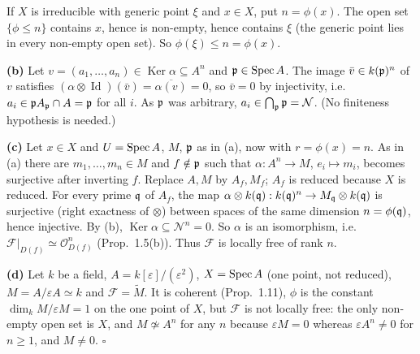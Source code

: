\documentclass[11pt]{article}
\begin{document}
If $X$ is irreducible with generic point $\xi$ and $x\in X$, put $n=\phi(x)$. The open set $\{\phi\le n\}$ contains $x$, hence is non-empty, hence contains $\xi$ (the generic point lies in every non-empty open set). So $\phi(\xi)\le n=\phi(x)$.

\textbf{(b)} Let $v=(a_1,\dots,a_n)\in\operatorname{Ker}\alpha\subseteq A^n$ and $\mathfrak p\in\operatorname{Spec} A$. The image $\bar v\in k(\mathfrak p)^n$ of $v$ satisfies $(\alpha\otimes\operatorname{Id})(\bar v)=\overline{\alpha(v)}=0$, so $\bar v=0$ by injectivity, i.e.\ $a_i\in\mathfrak p A_\mathfrak p\cap A=\mathfrak p$ for all $i$. As $\mathfrak p$ was arbitrary, $a_i\in\bigcap_\mathfrak p\mathfrak p=\mathcal N$. (No finiteness hypothesis is needed.)

\textbf{(c)} Let $x\in X$ and $U=\operatorname{Spec} A$, $M$, $\mathfrak p$ as in (a), now with $r=\phi(x)=n$. As in (a) there are $m_1,\dots,m_n\in M$ and $f\notin\mathfrak p$ such that $\alpha:A^n\to M$, $e_i\mapsto m_i$, becomes surjective after inverting $f$. Replace $A,M$ by $A_f,M_f$; $A_f$ is reduced because $X$ is reduced. For every prime $\mathfrak q$ of $A_f$, the map $\alpha\otimes k(\mathfrak q):k(\mathfrak q)^n\to M_\mathfrak q\otimes k(\mathfrak q)$ is surjective (right exactness of $\otimes$) between spaces of the same dimension $n=\phi(\mathfrak q)$, hence injective. By (b), $\operatorname{Ker}\alpha\subseteq\mathcal N^n=0$. So $\alpha$ is an isomorphism, i.e.\ $\mathcal F|_{D(f)}\simeq\mathcal O^n_{D(f)}$ (Prop.~1.5(b)). Thus $\mathcal F$ is locally free of rank $n$.

\textbf{(d)} Let $k$ be a field, $A=k[\varepsilon]/(\varepsilon^2)$, $X=\operatorname{Spec} A$ (one point, not reduced), $M=A/\varepsilon A\simeq k$ and $\mathcal F=\widetilde M$. It is coherent (Prop.~1.11), $\phi$ is the constant $\dim_kM/\varepsilon M=1$ on the one point of $X$, but $\mathcal F$ is not locally free: the only non-empty open set is $X$, and $M\not\simeq A^n$ for any $n$ because $\varepsilon M=0$ whereas $\varepsilon A^n\ne0$ for $n\ge1$, and $M\ne0$. \hfill$\square$
\end{document}
